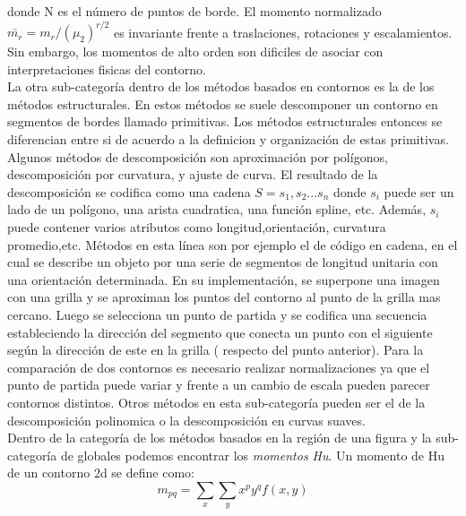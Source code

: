 donde N es el número de puntos de borde. El momento normalizado $\bar{m_r}=m_r / (\mu_2)^{r/2}$
es invariante frente a traslaciones, rotaciones y escalamientos. Sin 
embargo, los momentos de alto orden
son dificiles de asociar con interpretaciones fisicas del contorno.\\
\indent La otra sub-categoría dentro de los métodos basados en contornos es la de los métodos estructurales.
En estos métodos se suele descomponer un contorno en segmentos de bordes llamado primitivas. Los métodos estructurales
entonces se diferencian entre si de acuerdo a la definicion y organización de estas primitivas. Algunos métodos
de descomposición son aproximación por polígonos, descomposición por curvatura, y ajuste de curva. El resultado
de la descomposición se codifica como una cadena $S=s_1,s_2...s_n$ donde $s_i$ puede ser un lado de un polígono, una 
arista cuadratica, una función spline, etc. Además, $s_i$ puede contener varios atributos como longitud,orientación, curvatura promedio,etc.
Métodos en esta línea son por ejemplo el de código en cadena, en el cual se describe un objeto por una serie de segmentos de longitud unitaria
con una orientación determinada. En su implementación, se superpone una imagen con una grilla y se aproximan los puntos del contorno al 
punto de la grilla mas cercano. Luego se selecciona un punto de 
partida y se codifica una secuencia estableciendo la dirección del segmento
que conecta un punto con el siguiente según la dirección de este en 
la grilla ( respecto del punto  anterior). Para la comparación de dos
contornos es necesario realizar normalizaciones ya que el punto de 
partida puede variar y frente a un cambio de escala pueden parecer 
contornos distintos. Otros métodos en esta sub-categoría pueden ser el de la descomposición polinomica o la descomposición en curvas suaves. \\
\indent Dentro de la categoría de los métodos basados en la región 
de una figura y la sub-categoría de globales podemos encontrar los \textit{momentos Hu}.
Un momento de Hu de un contorno 2d se define como:
\[
	m_{pq}=\sum_{x}{\sum_{y}{x^py^qf(x,y)}}
\]

